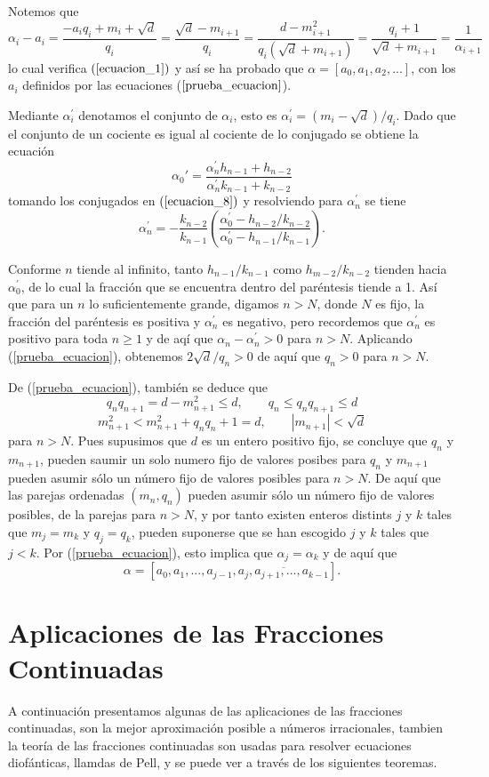 \documentclass[11pt, article]{article}
\begin{document}
    Notemos que 
        \[
        \alpha_i-a_i=\dfrac{-a_iq_i+m_i+\sqrt{d}}{q_i}=\dfrac{\sqrt{d}-m_{i+1}}{q_i}=\dfrac{d-m_{i+1}^2}{q_i(\sqrt{d}+m_{i+1})}=\dfrac{q_i+1}{\sqrt{d}+m_{i+1}}=\dfrac{1}{\alpha_{i+1}}
        \]
    lo cual verifica $(\ref{ecuacion_1})$ y así se ha probado que $\alpha=[a_0,a_1,a_2,...]$, con los $a_i$ definidos por las ecuaciones ($\ref{prueba_ecuacion}$).
    
    Mediante $\alpha^{'}_{i}$ denotamos el conjunto de $\alpha_i$, esto es $\alpha^{'}_{i}=(m_i-\sqrt{d})/q_i$. Dado que el conjunto de un cociente es igual al cociente de lo conjugado se obtiene la ecuación
        \[
        \alpha_0{'}=\dfrac{\alpha_n^{'}h_{n-1}+h_{n-2}}{\alpha_n^{'}k_{n-1}+k_{n-2}}
        \]
    tomando los conjugados en $(\ref{ecuacion_8})$ y resolviendo para $\alpha_n^{'}$ se tiene
        \[
        \alpha_n^{'}=-\dfrac{k_{n-2}}{k_{n-1}}\left(\dfrac{\alpha_0^{'}-h_{n-2}/k_{n-2}}{\alpha_0^{'}-h_{n-1}/k_{n-1}}\right).
        \]
        
    Conforme $n$ tiende al infinito, tanto $h_{n-1}/k_{n-1}$ como $h_{m-2}/k_{n-2}$ tienden hacia $\alpha_0^{'}$, de lo cual la fracción que se encuentra dentro del paréntesis tiende a 1. Así que para un $n$ lo suficientemente grande, digamos $n>N$, 
    donde $N$ es fijo, la fracción del paréntesis es positiva y $\alpha_n^{'}$ es negativo, pero recordemos que $\alpha_n^{'}$ es positivo para toda
    $n\geq 1$ y de aqí que $\alpha_n - \alpha_n^{'}>0$ para $n>N$. Aplicando (\ref{prueba_ecuacion}), obtenemos $2 \sqrt{d}/q_{n} >0$
    de aquí que $q_n>0$ para $n>N$.
    
    De (\ref{prueba_ecuacion}), también se deduce que 
        \[
        q_nq_{n+1}=d-m^2_{n+1}\leq d, \qquad q_n\leq q_nq_{n+1}\leq d 
        \]
        \[
        m^2_{n+1} < m_{n+1}^2+q_n q_n+1=d, \qquad |m_{n+1}|<\sqrt{d}
        \]
    para $n>N$. Pues supusimos que $d$ es un entero positivo fijo, se concluye que $q_n$ y $m_{n+1}$, pueden saumir un solo numero fijo de valores posibes para $q_n$ y $m_{n+1}$ pueden asumir sólo un número fijo de valores posibles para $n>N$. De aquí que las parejas ordenadas $(m_n,q_n)$ pueden asumir sólo un número fijo de valores posibles, de la parejas para $n>N$, y por tanto existen enteros distints $j$ y $k$ tales que $m_j=m_k$ y $q_j=q_k$, pueden suponerse que se han escogido $j$ y $k$ tales que $j<k$. Por (\ref{prueba_ecuacion}), esto implica que $\alpha_j=\alpha_k$ y de aquí que
        \[
        \alpha=[a_0,a_1,...,a_{j-1},\overline{a_j,a_{j+1},...,a_{k-1}}].
        \]
    \section*{Aplicaciones de las Fracciones Continuadas}
     A continuación presentamos algunas de las aplicaciones de las fracciones continuadas, son la mejor aproximación posible a números irracionales, tambien la teoría de las fracciones continuadas son usadas para resolver ecuaciones diofánticas, llamdas de Pell, y se puede ver a través de los siguientes teoremas.
     
\end{document}
